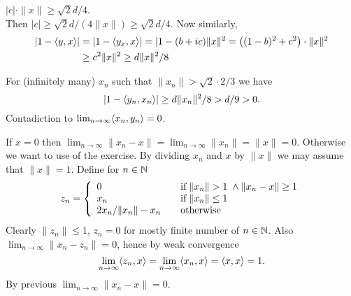 \begin{enumerate}
\begin{itemize}
\begin{enumerate}
\begin{itemize}
   \(|c|\cdot\|x\| \geq \sqrt{2}d/4\).\\
    Then \(|c| \geq \sqrt{2}d/\left(4\|x\|\right) \geq \sqrt{2}d/4\).
    Now similarly,
    \begin{align*}
    |1 - \langle y,x \rangle|
    &= |1 - \langle y_x,x \rangle|
    = |1 - (b + ic)\|x\|^2
    = \left((1 - b)^2 + c^2\right)\cdot\|x\|^2 \\
    &\geq c^2\|x\|^2
    \geq d\|x\|^2/8
    \end{align*}
  \end{itemize}
    For (infinitely many) \(x_n\) such that
    \(\|x_n\| > \sqrt{2}\cdot2/3\)  %
    we have
    \begin{equation*}
    |1 - \langle y_n,x_n \rangle| \geq d \|x_n\|^2/8 > d/9 > 0.
    \end{equation*}
    Contadiction to \(\lim_{n\to\infty} \langle x_n,y_n \rangle = 0\).
\end{enumerate}
If \(x=0\) then \(\lim_{n\to\infty}\|x_n - x\| = \lim_{n\to\infty}\|x_n\| = \|x\|=0\).
Otherwise we want to use  of the exercise.
By dividing \(x_n\) and $x$ by \(\|x\|\) we may assume
that \(\|x\|=1\).
Define for \(n\in\mathbb{N}\)
\begin{equation*}
 z_n =
 \left\{\begin{array}{ll}
 0 \quad & \textnormal{if}\;\|x_n\| > 1 \;\wedge \|x_n - x\| \geq 1 \\ 
 x_n \quad & \textnormal{if}\;\|x_n\|\leq 1 \\
 2x_n/\|x_n\|-x_n   \quad & \textnormal{otherwise}
 \end{array}
 \right.
\end{equation*}
Clearly \(\|z_n\|\leq 1\), \(z_n=0\) for mostly finite number of \(n\in \mathbb{N}\).
Also \hbox{\(\lim_{n\to\infty}\|x_n-z_n\| = 0\)}, hence by weak convergence
\begin{equation*}
\lim_{n\to\infty}\langle z_n,x \rangle = \lim_{n\to\infty}\langle x_n,x \rangle
 = \langle x,x \rangle = 1.
\end{equation*}
By previous  \(\lim_{n\to\infty} \|x_n - x\| = 0\).
\end{itemize}


\end{enumerate}


